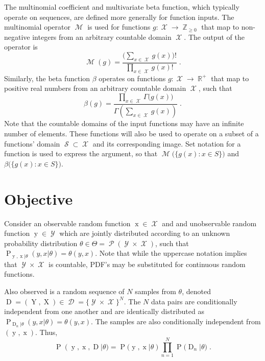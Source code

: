 \documentclass[12pt]{article}
\DeclareMathOperator{\xrm}{\mathrm{x}}
\DeclareMathOperator{\Xrm}{\mathrm{X}}
\DeclareMathOperator{\yrm}{\mathrm{y}}
\DeclareMathOperator{\Yrm}{\mathrm{Y}}
\DeclareMathOperator{\Drm}{\mathrm{D}}
\DeclareMathOperator{\Prm}{\mathrm{P}}
\DeclareMathOperator{\Xcal}{\mathcal{X}}
\DeclareMathOperator{\Ycal}{\mathcal{Y}}
\DeclareMathOperator{\Dcal}{\mathcal{D}}
\DeclareMathOperator{\Mcal}{\mathcal{M}}
\DeclareMathOperator{\Scal}{\mathcal{S}}
\DeclareMathOperator{\Pcal}{\mathcal{P}}
\DeclareMathOperator{\Rbb}{\mathbb{R}}
\DeclareMathOperator{\Zbb}{\mathbb{Z}}
\begin{document}
The multinomial coefficient and multivariate beta function, which typically operate on sequences, are defined more generally for function inputs. The multinomial operator $\Mcal$ is used for functions $g : \Xcal \to \Zbb_{\geq 0}$ that map to non-negative integers from an arbitrary countable domain $\Xcal$. The output of the operator is
\begin{equation}
\Mcal(g) = \frac{\big( \sum_{x \in \Xcal} g(x) \big)!}{\prod_{x \in \Xcal} g(x)!} \;.
\end{equation}
Similarly, the beta function $\beta$ operates on functions $g : \Xcal \to \Rbb^+$ that map to positive real numbers from an arbitrary countable domain $\Xcal$, such that
\begin{equation}
\beta(g) = \frac{\prod_{x \in \Xcal} \Gamma\big( g(x) \big)}{\Gamma \left( \sum_{x \in \Xcal} g(x) \right)} \;.
\end{equation}
Note that the countable domains of the input functions may have an infinite number of elements. These functions will also be used to operate on a subset of a functions' domain $\Scal \subset \Xcal$ and its corresponding image. Set notation for a function is used to express the argument, so that $\Mcal\Big( \big\{ g(x) : x \in S \big\} \Big)$ and $\beta\Big( \big\{ g(x) : x \in S \big\} \Big)$.







\section{Objective}

Consider an observable random function $\xrm \in \Xcal$ and and unobservable random function $\yrm \in \Ycal$ which are jointly distributed according to an unknown probability distribution $\theta \in \Theta = \Pcal(\Ycal \times \Xcal)$, such that $\Prm_{\yrm,\xrm | \theta}(y,x | \theta) = \theta(y,x)$. Note that while the uppercase notation implies that $\Ycal \times \Xcal$ is countable, PDF's may be substituted for continuous random functions.

Also observed is a random sequence of $N$ samples from $\theta$, denoted $\Drm = ( \Yrm,\Xrm ) \in \Dcal = \{\Ycal \times \Xcal\}^N$. The $N$ data pairs are conditionally independent from one another and are identically distributed as $\Prm_{\Drm_n | \theta}(y,x | \theta) = \theta(y,x)$. The samples are also conditionally independent from $(\yrm,\xrm)$. Thus,
\begin{equation}
\Prm(\yrm,\xrm,\Drm | \theta) = \Prm(\yrm,\xrm | \theta) \prod_{n=1}^N \Prm\big( \Drm_n | \theta \big) \;.
\end{equation}
\end{document}
